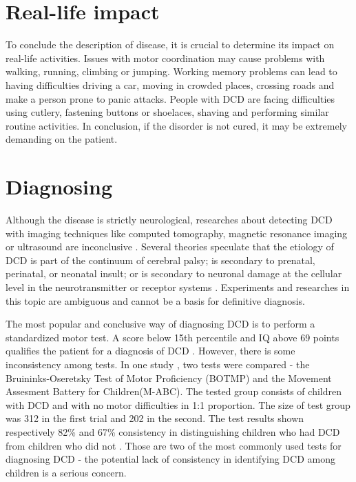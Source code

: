 \section{Real-life impact}
To conclude the description of disease, it is crucial to determine its impact on real-life activities. Issues with motor coordination may cause problems with walking, running, climbing or jumping. Working memory problems can lead to having difficulties driving a car, moving in crowded places, crossing roads and make a person prone to panic attacks. People with DCD are facing difficulties using cutlery, fastening buttons or shoelaces, shaving and performing similar routine activities. In conclusion, if the disorder is not cured, it may be extremely demanding on the patient.

\section{Diagnosing}
Although the disease is strictly neurological, researches about detecting DCD with imaging techniques like computed tomography, magnetic resonance imaging or ultrasound are inconclusive \cite{3}. %
Several theories speculate that the etiology of DCD is part of the continuum of cerebral palsy; is secondary to prenatal, perinatal, or neonatal insult; or is secondary to neuronal damage at the cellular level in the neurotransmitter or receptor systems \cite{5}. Experiments and researches in this topic are ambiguous and cannot be a basis for definitive diagnosis.

The most popular and conclusive way of diagnosing DCD is to perform a standardized motor test. A score below 15th percentile and IQ above 69 points qualifies the patient for a diagnosis of DCD \cite{22}. However, there is some inconsistency among tests. In one study \cite{10}, two tests were compared - the Bruininks-Oseretsky Test of Motor Proficiency (BOTMP) and the Movement Assesment Battery for Children(M-ABC). The tested group consists of children with DCD and with no motor difficulties in 1:1 proportion. The size of test group was 312 in the first trial and 202 in the second. The test results shown respectively 82\% and 67\% consistency in distinguishing children who had DCD from children who did not \cite{5}. Those are two of the most commonly used tests for diagnosing DCD - the potential lack of consistency in identifying DCD among children is a serious concern.

